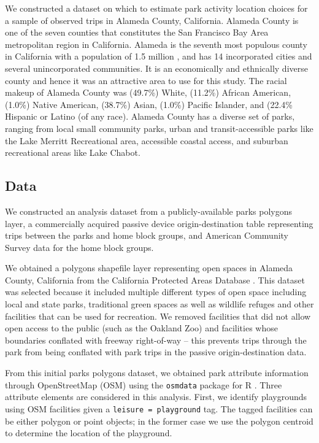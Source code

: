 \documentclass[3p, authoryear]{elsarticle} %
\begin{document}
We constructed a dataset on which to estimate park activity location choices for
a sample of observed trips in Alameda County, California. Alameda County is one
of the seven counties that constitutes the San Francisco Bay Area metropolitan
region in California. Alameda is the seventh most populous county in California
with a population of 1.5 million \citep{alamedafacts}, and has 14 incorporated cities
and several unincorporated communities. It is an economically and ethnically
diverse county and hence it was an attractive area to use for this study. The
racial makeup of Alameda County was (49.7\%) White, (11.2\%) African American,
(1.0\%) Native American, (38.7\%) Asian, (1.0\%) Pacific Islander, and (22.4\%
Hispanic or Latino (of any race). Alameda County has a diverse set of parks,
ranging from local small community parks, urban and transit-accessible parks
like the Lake Merritt Recreational area, accessible coastal access, and suburban
recreational areas like Lake Chabot.

\hypertarget{data}{%
\subsection{Data}\label{data}}

We constructed an analysis dataset from a publicly-available parks polygons
layer, a commercially acquired passive device origin-destination table
representing trips between the parks and home block groups, and American
Community Survey data for the home block groups.

We obtained a polygons shapefile layer representing open spaces in Alameda
County, California from the California Protected Areas Database \citep{cpad2019}.
This dataset was selected because it included multiple different types of open
space including local and state parks, traditional green spaces as well as
wildlife refuges and other facilities that can be used for recreation. We
removed facilities that did not allow open access to the public (such as the
Oakland Zoo) and facilities whose boundaries conflated with freeway right-of-way
-- this prevents trips through the park from being conflated with park trips in
the passive origin-destination data.

From this initial parks polygons dataset, we obtained park attribute information
through OpenStreetMap (OSM) using the \texttt{osmdata} package for R \citep{osmdata}. Three
attribute elements are considered in this analysis. First, we identify playgrounds
using OSM facilities given a \texttt{leisure\ =\ playground} tag. The tagged facilities can
be either polygon or point objects; in the former case we use the polygon centroid
to determine the location of the playground.
\end{document}
